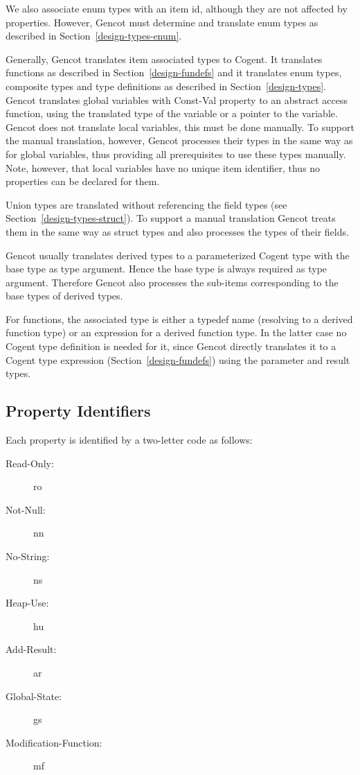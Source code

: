 We also associate enum types with an item id, although they are not affected by properties. However, Gencot must determine 
and translate enum types as described in Section~\ref{design-types-enum}.

Generally, Gencot translates item associated types to Cogent. It translates functions as described in Section~\ref{design-fundefs}
and it translates enum types, composite types and type definitions as described in Section~\ref{design-types}.
Gencot translates global variables with Const-Val property to an abstract access function, using the translated 
type of the variable or a pointer to the variable.
Gencot does not translate local variables, this must be done manually. To support the manual translation, 
however, Gencot processes their types in the same way as for global variables, thus providing all prerequisites
to use these types manually. Note, however, that local variables have no unique item identifier, thus no properties
can be declared for them.

Union types are translated without referencing the field types
(see Section~\ref{design-types-struct}). To support a manual translation Gencot treats them in 
the same way as struct types and also processes the types of their fields.

Gencot usually translates derived types to a parameterized Cogent type with the base type as type argument. Hence the base
type is always required as type argument. Therefore Gencot also processes the sub-items corresponding to the base types 
of derived types.

For functions, the associated type is either a typedef name (resolving to a derived function type) 
or an expression for a derived function type. In the latter case no Cogent type definition is needed for it, since Gencot
directly translates it to a Cogent type expression (Section~\ref{design-fundefs}) using the parameter and result types. 

\subsection{Property Identifiers}
\label{impl-itemprops-property}

Each property is identified by a two-letter code as follows:
\begin{description}
\item[Read-Only:] ro
\item[Not-Null:] nn
\item[No-String:] ns
\item[Heap-Use:] hu
\item[Add-Result:] ar
\item[Global-State:] gs
\item[Modification-Function:] mf
\end{description}

